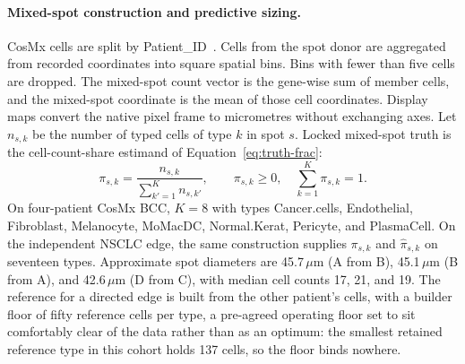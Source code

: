\paragraph{Mixed-spot construction and predictive sizing.}
CosMx cells are split by Patient\_ID~\citep{Andreatta2024zenodo,Yerly2025preprint}. Cells from the spot donor are aggregated from recorded coordinates into square spatial bins. Bins with fewer than five cells are dropped. The mixed-spot count vector is the gene-wise sum of member cells, and the mixed-spot coordinate is the mean of those cell coordinates. Display maps convert the native pixel frame to micrometres without exchanging axes. Let \(n_{s,k}\) be the number of typed cells of type \(k\) in spot \(s\). Locked mixed-spot truth is the cell-count-share estimand of Equation~\eqref{eq:truth-frac}:
\begin{equation}
\pi_{s,k}=\frac{n_{s,k}}{\sum_{k'=1}^{K}n_{s,k'}},\qquad \pi_{s,k}\ge 0,\quad \sum_{k=1}^{K}\pi_{s,k}=1.
\label{eq:truth-frac}
\end{equation}
On four-patient CosMx BCC, \(K=8\) with types Cancer.cells, Endothelial, Fibroblast, Melanocyte, MoMacDC, Normal.Kerat, Pericyte, and PlasmaCell. On the independent NSCLC edge, the same construction supplies \(\pi_{s,k}\) and \(\hat\pi_{s,k}\) on seventeen types. Approximate spot diameters are 45.7\,\(\mu\)m (A from B), 45.1\,\(\mu\)m (B from A), and 42.6\,\(\mu\)m (D from C), with median cell counts 17, 21, and 19. The reference for a directed edge is built from the other patient's cells, with a builder floor of fifty reference cells per type, a pre-agreed operating floor set to sit comfortably clear of the data rather than as an optimum: the smallest retained reference type in this cohort holds 137 cells, so the floor binds nowhere.

